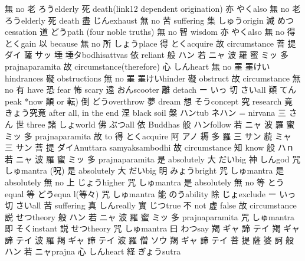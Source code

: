 {無}	{}{no}
{老}	{ろう}{elderly}
{死}	{}{death(link12 dependent origination)}
{亦}	{やく}{also}
{無}	{}{no}
{老}	{ろう}{elderly}
{死}	{}{death}
{盡}	{じん}{exhaust}
{無}	{}{no}
{苦}	{}{suffering}
{集}	{しゅう}{origin}
{滅}	{めつ}{cessation}
{道}	{どう}{path (four noble truths)}
{無}	{}{no}
{智}	{}{wisdom}
{亦}	{やく}{also}
{無}	{}{no}
{得}	{とく}{gain}
{以}	{}{because}
{無}	{}{no}
{所}	{しょう}{place}
{得}	{とく}{acquire}
{故}	{}{circumstance}
{菩}	{}{}
{提}	{ダイ}{}
{薩}	{サッ}{}
{\textsf{埵}}	{\textsf{埵}}{タ}{bodhisattvas} %
{依}	{}{reliant}
{般}	{ハン}{}
{若}	{ニャ}{}
{波}	{}{}
{羅}	{}{}
{蜜}	{ミッ}{}
{多}	{}{prajnaparamita}
{故}	{}{circumstance(therefore)}
{心}	{しん}{heart}
{無}	{}{no}
{\textsf{罣}}	{\textsf{罣}}{けい}{hindrances}%
{礙}	{}{obstructions}
{無}	{}{no}
{\textsf{罣}}	{\textsf{罣}}{けい}{hinder}%
{礙}	{}{obstruct}
{故}	{}{circumstance}
{無}	{}{no}
{有}	{}{have}
{恐}	{}{fear}
{怖}	{}{scary}
{遠}	{おん}{scooter}
{離}	{}{detach}
{ー}	{いっ}{}
{切}	{さい}{all}
{顚}	{てん}{peak *now 顛 or 転)}
{倒}	{どう}{overthrow}
{夢}	{}{dream}
{想}	{そう}{concept}
{究}	{}{research}
{竟}	{きょう}{究竟 after all, in the end}
{涅}	{}{black soil}
{槃}	{ハン}{tub ネハン = nirvana}
{三}	{さん}{}
{世}	{}{three}
{諸}	{しょ}{world}
{佛}	{ぶつ}{all}
{依}	{}{Buddhas}
{般}	{ハン}{follow}
{若}	{ニャ}{}
{波}	{}{}
{羅}	{}{}
{蜜}	{ミッ}{}
{多}	{}{prajnaparamita}
{故}	{}{to}
{得}	{とく}{acquire}
{阿}	{アノ}{}
{耨}	{}{}
{多}	{}{}
{羅}	{}{}
{三}	{サン}{}
{藐}	{ミャ}{}
{三}	{サン}{}
{菩}	{}{}
{提}	{ダイ}{Anuttara samyaksambodhi}
{故}	{}{circumstance}
{知}	{}{know}
{般}	{ハｎ}{}
{若}	{ニャ}{}
{波}	{}{}
{羅}	{}{}
{蜜}	{ミッ}{}
{多}	{}{prajnaparamita}
{是}	{}{absolutely}
{大}	{だい}{big}
{神}	{しん}{god}
{咒}	{しゅ}{mantra (呪)}
{是}	{}{absolutely}
{大}	{だい}{big}
{明}	{みょう}{bright}
{咒}	{しゅ}{mantra}
{是}	{}{absolutely}
{無}	{}{no}
{上}	{じょう}{higher}
{咒}	{しゅ}{mantra}
{是}	{}{absolutely}
{無}	{}{no}
{等}	{とう}{equal}
{等}	{どう}{equa l(等々)}
{咒}	{しゅ}{mantra}
{能}	{のう}{ability}
{除}	{じょ}{exclude}
{ー}	{いっ}{}
{切}	{さい}{all}
{苦}	{}{suffering}
{真}	{しん}{really}
{實}	{じつ}{true}
{不}	{}{not}
{虚}	{}{false}
{故}	{}{circumstance}
{説}	{せつ}{theory}
{般}	{ハン}{}
{若}	{ニャ}{}
{波}	{}{}
{羅}	{}{}
{蜜}	{ミッ}{}
{多}	{}{prajnaparamita}
{咒}	{しゅ}{mantra}
{即}	{そく}{instant}
{説}	{せつ}{theory}
{咒}	{しゅ}{mantra}
{曰}	{わつ}{say}
{羯}	{ギャ}{}
{諦}	{テイ}{}
{羯}	{ギャ}{}
{諦}	{テイ}{}
{波}	{}{}
{羅}	{}{}
{羯}	{ギャ}{}
{諦}	{テイ}{}
{波}	{}{}
{羅}	{}{}
{僧}	{ソウ}{}
{羯}	{ギャ}{}
{諦}	{テイ}{}
{菩}	{}{}
{提}	{}{}
{薩}	{}{}
{婆}	{}{}
{訶}	{}{}
{般}	{ハン}{}
{若}	{ニャ}{prajna}
{心}	{しん}{heart}
{経}	{ぎょう}{sutra}
	
